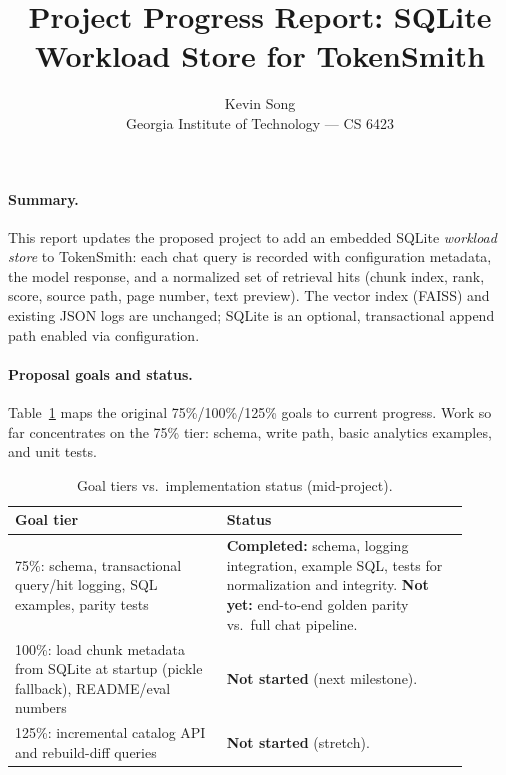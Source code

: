 \documentclass[10pt,twocolumn]{article}
\title{\vspace{-1.4em}Project Progress Report: SQLite Workload Store for TokenSmith\vspace{-0.45em}}
\author{Kevin Song \\ Georgia Institute of Technology --- CS 6423}
\date{}
\begin{document}
\maketitle
\vspace{-1.1em}

\paragraph{Summary.}
This report updates the proposed project to add an embedded SQLite \emph{workload store} to TokenSmith: each chat query is recorded with configuration metadata, the model response, and a normalized set of retrieval hits (chunk index, rank, score, source path, page number, text preview). The vector index (FAISS) and existing JSON logs are unchanged; SQLite is an optional, transactional append path enabled via configuration.

\paragraph{Proposal goals and status.}
Table~\ref{tab:goals} maps the original 75\%/100\%/125\% goals to current progress. Work so far concentrates on the 75\% tier: schema, write path, basic analytics examples, and unit tests.

\begin{table}[t]
\centering
\small
\begin{tabular}{@{}p{0.42\linewidth}p{0.48\linewidth}@{}}
\hline
Goal tier & Status \\
\hline
75\%: schema, transactional query/hit logging, SQL examples, parity tests &
\textbf{Completed:} schema, logging integration, example SQL, tests for normalization and integrity. \textbf{Not yet:} end-to-end golden parity vs.\ full chat pipeline. \\
100\%: load chunk metadata from SQLite at startup (pickle fallback), README/eval numbers &
\textbf{Not started} (next milestone). \\
125\%: incremental catalog API and rebuild-diff queries &
\textbf{Not started} (stretch). \\
\hline
\end{tabular}
\vspace{-0.5em}
\caption{Goal tiers vs.\ implementation status (mid-project).}
\label{tab:goals}
\vspace{-0.8em}
\end{table}
\end{document}
